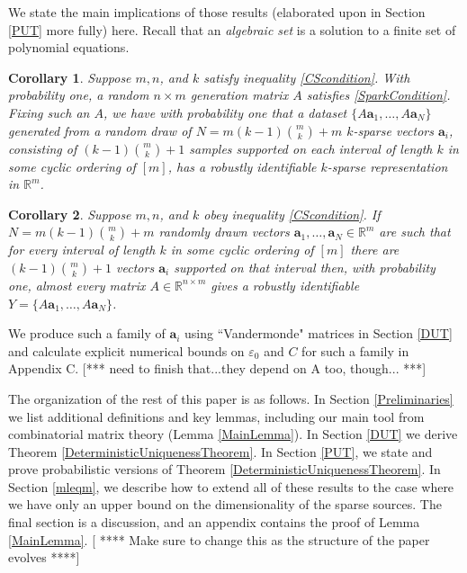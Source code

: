 \documentclass[journal, onecolumn]{IEEEtran}
\newtheorem{corollary}{Corollary}
\begin{document}
We state the main implications of those results (elaborated upon in Section \ref{PUT} more fully) here. Recall that an \emph{algebraic set} is a solution to a finite set of polynomial equations.

\begin{corollary}
Suppose $m, n$, and $k$ satisfy inequality \eqref{CScondition}. With probability one, a random $n \times m$ generation matrix $A$ satisfies \eqref{SparkCondition}. Fixing such an $A$, we have with probability one that a dataset $\{A\mathbf{a}_1, \ldots , A\mathbf{a}_N\}$ generated from a random draw of $N = m(k-1){m \choose k}+m$ $k$-sparse vectors $\mathbf{a}_i$, consisting of $(k-1){m \choose k}+1$ samples supported on each interval of length $k$ in some cyclic ordering of $[m]$, has a robustly identifiable $k$-sparse representation in $\mathbb{R}^m$.
\end{corollary}

\begin{corollary}
Suppose $m, n$, and $k$ obey inequality \eqref{CScondition}.  If $N = m(k-1){m \choose k}+m$ randomly drawn vectors $\mathbf{a}_1, \ldots, \mathbf{a}_N \in \mathbb{R}^m$ are such that for every interval of length $k$ in some cyclic ordering of $[m]$ there are $(k-1){m \choose k}+1$ vectors $\mathbf{a}_i$ supported on that interval then, with probability one, almost every matrix $A \in \mathbb{R}^{n \times m}$ gives a robustly identifiable $Y = \{A\mathbf{a}_1, \ldots , A\mathbf{a}_N \}$.
\end{corollary}




We produce such a family of $\mathbf{a}_i$ using ``Vandermonde" matrices in Section \ref{DUT} and calculate explicit numerical bounds on $\varepsilon_0$ and $C$ for such a family in Appendix C. [*** need to finish that...they depend on A too, though... ***] 


The organization of the rest of this paper is as follows. In Section \ref{Preliminaries} we list additional definitions and key lemmas, including our main tool from combinatorial matrix theory (Lemma \ref{MainLemma}). In Section \ref{DUT} we derive Theorem \ref{DeterministicUniquenessTheorem}. In Section \ref{PUT}, we state and prove probabilistic versions of Theorem \ref{DeterministicUniquenessTheorem}. In Section \ref{mleqm}, we describe how to extend all of these results to the case where we have only an upper bound on the dimensionality of the sparse sources. The final section is a discussion, and an appendix contains the proof of Lemma \ref{MainLemma}.
[ **** Make sure to change this as the structure of the paper evolves ****]
\end{document}
